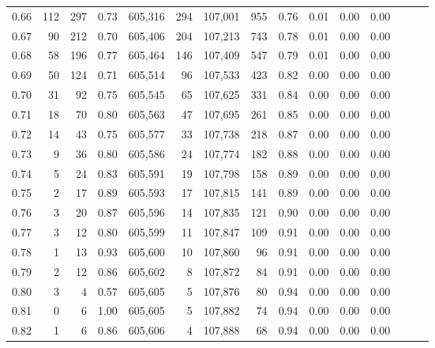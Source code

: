 \begin{tabular}{rrrrrrrrrrrrrrr}
0.66 &     112 &    297 &  0.73 &  605,316 &      294 &  107,001 &      955 &  0.76 &  0.01 &  0.00 &      0.00 \\
0.67 &      90 &    212 &  0.70 &  605,406 &      204 &  107,213 &      743 &  0.78 &  0.01 &  0.00 &      0.00 \\
0.68 &      58 &    196 &  0.77 &  605,464 &      146 &  107,409 &      547 &  0.79 &  0.01 &  0.00 &      0.00 \\
0.69 &      50 &    124 &  0.71 &  605,514 &       96 &  107,533 &      423 &  0.82 &  0.00 &  0.00 &      0.00 \\
0.70 &      31 &     92 &  0.75 &  605,545 &       65 &  107,625 &      331 &  0.84 &  0.00 &  0.00 &      0.00 \\
0.71 &      18 &     70 &  0.80 &  605,563 &       47 &  107,695 &      261 &  0.85 &  0.00 &  0.00 &      0.00 \\
0.72 &      14 &     43 &  0.75 &  605,577 &       33 &  107,738 &      218 &  0.87 &  0.00 &  0.00 &      0.00 \\
0.73 &       9 &     36 &  0.80 &  605,586 &       24 &  107,774 &      182 &  0.88 &  0.00 &  0.00 &      0.00 \\
0.74 &       5 &     24 &  0.83 &  605,591 &       19 &  107,798 &      158 &  0.89 &  0.00 &  0.00 &      0.00 \\
0.75 &       2 &     17 &  0.89 &  605,593 &       17 &  107,815 &      141 &  0.89 &  0.00 &  0.00 &      0.00 \\
0.76 &       3 &     20 &  0.87 &  605,596 &       14 &  107,835 &      121 &  0.90 &  0.00 &  0.00 &      0.00 \\
0.77 &       3 &     12 &  0.80 &  605,599 &       11 &  107,847 &      109 &  0.91 &  0.00 &  0.00 &      0.00 \\
0.78 &       1 &     13 &  0.93 &  605,600 &       10 &  107,860 &       96 &  0.91 &  0.00 &  0.00 &      0.00 \\
0.79 &       2 &     12 &  0.86 &  605,602 &        8 &  107,872 &       84 &  0.91 &  0.00 &  0.00 &      0.00 \\
0.80 &       3 &      4 &  0.57 &  605,605 &        5 &  107,876 &       80 &  0.94 &  0.00 &  0.00 &      0.00 \\
0.81 &       0 &      6 &  1.00 &  605,605 &        5 &  107,882 &       74 &  0.94 &  0.00 &  0.00 &      0.00 \\
0.82 &       1 &      6 &  0.86 &  605,606 &        4 &  107,888 &       68 &  0.94 &  0.00 &  0.00 &      0.00 \\

\end{tabular}
